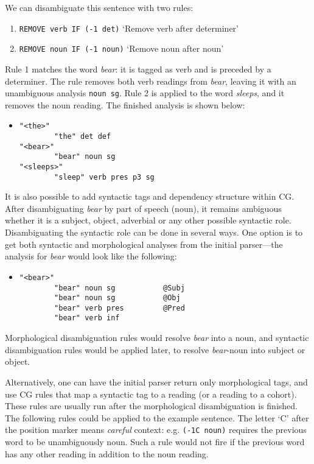 \noindent We can disambiguate this sentence with two rules:

\begin{enumerate}
\def\labelenumi{\arabic{enumi}.}
\itemsep1pt\parskip0pt
\item \texttt{REMOVE verb IF (-1 det)}
  `Remove verb after determiner'
\item  \texttt{REMOVE noun IF (-1 noun)}
  `Remove noun after noun'
\end{enumerate}

\noindent Rule 1 matches the word \emph{bear}: it is tagged as verb and is
preceded by a determiner. The rule removes both verb readings from
\emph{bear}, leaving it with an unambiguous analysis \texttt{noun sg}.
Rule 2 is applied to the word \emph{sleeps}, and it removes the noun
reading. The finished analysis is shown below:

\begin{itemize}
\item[] \begin{verbatim}
"<the>"
        "the" det def
"<bear>"
        "bear" noun sg
"<sleeps>"
        "sleep" verb pres p3 sg
\end{verbatim}
\end{itemize}

It is also possible to add syntactic tags and dependency structure within CG. 
After disambiguating \emph{bear} by part of speech (noun), it
remains ambiguous whether it is a subject, object, adverbial or
any other possible syntactic role.
Disambiguating the syntactic role can be done in several ways. One option is to get both
syntactic and morphological analyses from the initial parser---the analysis
for \emph{bear} would look like the following:

\begin{itemize}
\item[] \begin{verbatim}
"<bear>"
        "bear" noun sg           @Subj
        "bear" noun sg           @Obj
        "bear" verb pres         @Pred
        "bear" verb inf 
\end{verbatim}
\end{itemize}

\noindent Morphological disambiguation rules would
resolve \emph{bear} into a noun, and syntactic disambiguation rules
would be applied later, to resolve \emph{bear}-noun into subject or object.

Alternatively, one can have the initial parser return only
morphological tags, and use CG rules that map a syntactic tag to a
reading (or a reading to a cohort).
These rules are usually run after the morphological disambiguation is
finished.
The following rules could be applied to the example sentence. The
letter `C' after the position marker means \emph{careful} context: e.g. 
\texttt{(-1C noun)} requires the previous word to be unambiguously
noun. Such a rule would not fire if the previous word has any other
reading in addition to the noun reading.

